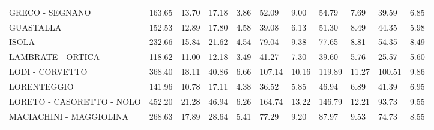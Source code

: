 \begin{table}[H]
{{\begin{tabular}{lp{1.3cm}p{1.3cm}p{1.3cm}p{1.3cm}p{1.3cm}p{1.3cm}p{1.3cm}p{1.3cm}p{1.3cm}p{1.3cm}}
GRECO - SEGNANO                                    &                    163.65 &                 13.70 &                       17.18 &                    3.86 &                       52.09 &                    9.00 &                       54.79 &                    7.69 &                     39.59 &                  6.85 \\
GUASTALLA                                          &                    152.53 &                 12.89 &                       17.80 &                    4.58 &                       39.08 &                    6.13 &                       51.30 &                    8.49 &                     44.35 &                  5.98 \\
ISOLA                                              &                    232.66 &                 15.84 &                       21.62 &                    4.54 &                       79.04 &                    9.38 &                       77.65 &                    8.81 &                     54.35 &                  8.49 \\
LAMBRATE - ORTICA                                  &                    118.62 &                 11.00 &                       12.18 &                    3.49 &                       41.27 &                    7.30 &                       39.60 &                    5.76 &                     25.57 &                  5.60 \\
LODI - CORVETTO                                    &                    368.40 &                 18.11 &                       40.86 &                    6.66 &                      107.14 &                   10.16 &                      119.89 &                   11.27 &                    100.51 &                  9.86 \\
LORENTEGGIO                                        &                    141.96 &                 10.78 &                       17.11 &                    4.38 &                       36.52 &                    5.85 &                       46.94 &                    6.89 &                     41.39 &                  6.95 \\
LORETO - CASORETTO - NOLO                          &                    452.20 &                 21.28 &                       46.94 &                    6.26 &                      164.74 &                   13.22 &                      146.79 &                   12.21 &                     93.73 &                  9.55 \\
MACIACHINI - MAGGIOLINA                            &                    268.63 &                 17.89 &                       28.64 &                    5.41 &                       77.29 &                    9.20 &                       87.97 &                    9.53 &                     74.73 &                  8.55 \\

\end{tabular}}}
\end{table}
